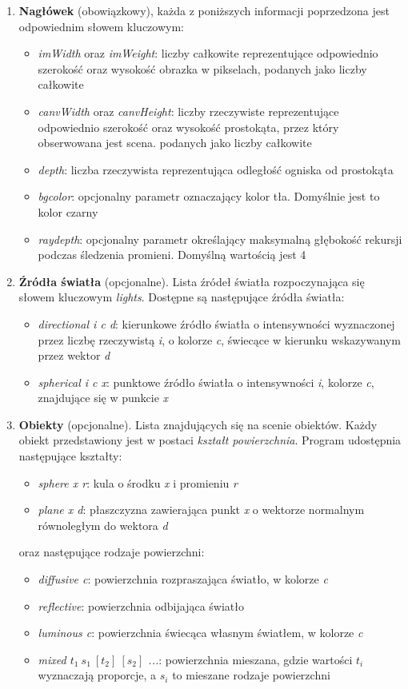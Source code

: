 \documentclass[11pt,a4paper]{article}
\begin{document}
\begin{enumerate}
\item\textbf{Nagłówek} (obowiązkowy), każda z poniższych informacji poprzedzona jest odpowiednim słowem kluczowym:
\begin{itemize}
\item\textit{imWidth} oraz \textit{imWeight}: liczby całkowite reprezentujące odpowiednio szerokość oraz wysokość obrazka w pikselach, podanych jako liczby całkowite
\item\textit{canvWidth} oraz \textit{canvHeight}: liczby rzeczywiste reprezentujące odpowiednio szerokość oraz wysokość prostokąta, przez który obserwowana jest scena. podanych jako liczby całkowite
\item\textit{depth}: liczba rzeczywista reprezentująca odległość ogniska od prostokąta
\item\textit{bgcolor}: opcjonalny parametr oznaczający kolor tła. Domyślnie jest to kolor czarny
\item\textit{raydepth}: opcjonalny parametr określający maksymalną głębokość rekursji podczas śledzenia promieni. Domyślną wartością jest 4
\end{itemize}
\item\textbf{Źródła światła} (opcjonalne). Lista źródeł światła rozpoczynająca się słowem kluczowym \textit{lights}. Dostępne są następujące źródła światła:
\begin{itemize}
\item\textit{directional i c d}: kierunkowe źródło światła o intensywności wyznaczonej przez liczbę rzeczywistą \textit{i}, o kolorze \textit{c}, świecące w kierunku wskazywanym przez wektor \textit{d}
\item\textit{spherical i c x}: punktowe źródło światła o intensywności \textit{i}, kolorze \textit{c}, znajdujące się w punkcie \textit{x}
\end{itemize}
\item\textbf{Obiekty} (opcjonalne). Lista znajdujących się na scenie obiektów. Każdy obiekt przedstawiony jest w postaci \textit{kształt powierzchnia}. Program udostępnia następujące kształty:
\begin{itemize}
\item\textit{sphere x r}: kula o środku \textit{x} i promieniu \textit{r}
\item\textit{plane x d}: płaszczyzna zawierająca punkt \textit{x} o wektorze normalnym równoległym do wektora \textit{d}
\end{itemize}
oraz następujące rodzaje powierzchni:
\begin{itemize}
\item\textit{diffusive c}: powierzchnia rozpraszająca światło, w kolorze \textit{c}
\item\textit{reflective}: powierzchnia odbijająca światło
\item\textit{luminous c}: powierzchnia świecąca własnym światłem, w kolorze \textit{c}
\item\textit{mixed $t_{1}\ s_{1}\ [t_{2}]\ [s_{2}]$ ...}: powierzchnia mieszana, gdzie wartości \textit{$t_{i}$} wyznaczają proporcje, a \textit{$s_{i}$} to mieszane rodzaje powierzchni
\end{itemize}
\end{enumerate}
\end{document}
